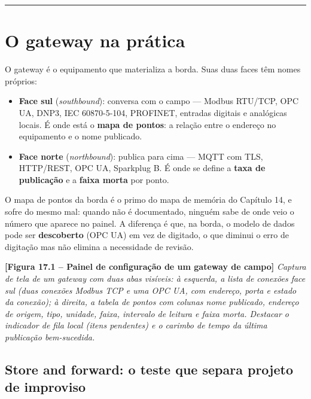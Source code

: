 \begin{center}\rule{0.5\linewidth}{0.5pt}\end{center}

\section{O gateway na prática}\label{o-gateway-na-pruxe1tica}

O gateway é o equipamento que materializa a borda. Suas duas faces têm nomes próprios:

\begin{itemize}
\tightlist
\item
  \textbf{Face sul} (\emph{southbound}): conversa com o campo --- Modbus RTU/TCP, OPC UA, DNP3, IEC 60870-5-104,
  PROFINET, entradas digitais e analógicas locais. É onde está o \textbf{mapa de pontos}: a relação entre
  o endereço no equipamento e o nome publicado.
\item
  \textbf{Face norte} (\emph{northbound}): publica para cima --- MQTT com TLS, HTTP/REST, OPC UA, Sparkplug B.
  É onde se define a \textbf{taxa de publicação} e a \textbf{faixa morta} por ponto.
\end{itemize}

O mapa de pontos da borda é o primo do mapa de memória do Capítulo 14, e sofre do mesmo mal: quando
não é documentado, ninguém sabe de onde veio o número que aparece no painel. A diferença é que, na
borda, o modelo de dados pode ser \textbf{descoberto} (OPC UA) em vez de digitado, o que diminui o erro
de digitação mas não elimina a necessidade de revisão.

\begin{caixafigura}

\textbf{{[}Figura 17.1 -- Painel de configuração de um gateway de campo{]}}
\emph{Captura de tela de um gateway com duas abas visíveis: à esquerda, a lista de conexões face sul (duas conexões Modbus TCP e uma OPC UA, com endereço, porta e estado da conexão); à direita, a tabela de pontos com colunas nome publicado, endereço de origem, tipo, unidade, faixa, intervalo de leitura e faixa morta. Destacar o indicador de fila local (itens pendentes) e o carimbo de tempo da última publicação bem-sucedida.}

\end{caixafigura}

\subsection{Store and forward: o teste que separa projeto de improviso}\label{store-and-forward-o-teste-que-separa-projeto-de-improviso}

